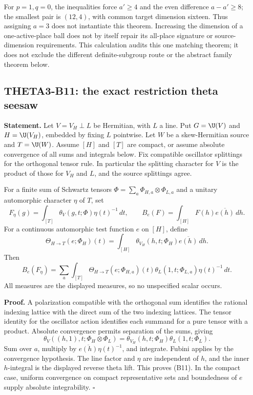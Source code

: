 For $p=1,q=0$, the inequalities force $a'\geq4$ and the even difference $a-a'\geq8$; the smallest pair is $(12,4)$, with common target dimension sixteen. Thus assigning $a=3$ does not instantiate this theorem. Increasing the dimension of a one-active-place ball does not by itself repair its all-place signature or source-dimension requirements. This calculation audits this one matching theorem; it does not exclude the different definite-subgroup route or the abstract family theorem below.

\subsection{THETA3-B11: the exact restriction theta seesaw}\label{B11}

\textbf{Statement.} Let $V=V_H\perp L$ be Hermitian, with $L$ a line. Put $G=\U(V)$ and $H=\U(V_H)$, embedded by fixing $L$ pointwise. Let $W$ be a skew-Hermitian source and $T=\U(W)$. Assume $[H]$ and $[T]$ are compact, or assume absolute convergence of all sums and integrals below. Fix compatible oscillator splittings for the orthogonal tensor rule. In particular the splitting character for $V$ is the product of those for $V_H$ and $L$, and the source splittings agree.

For a finite sum of Schwartz tensors
$\Phi=\sum_a\Phi_{H,a}\otimes\Phi_{L,a}$ and a unitary automorphic character $\eta$ of $T$, set
\[
 F_\eta(g)=\int_{[T]}\theta_V(g,t;\Phi)\eta(t)^{-1}\,dt,
 \qquad
 B_e(F)=\int_{[H]}F(h)\overline{e(h)}\,dh.
\]
For a continuous automorphic test function $e$ on $[H]$, define
\[
 \Theta_{H\to T}(e;\Phi_H)(t)=
 \int_{[H]}\theta_{V_H}(h,t;\Phi_H)\overline{e(h)}\,dh.
\]
Then
\[
 B_e(F_\eta)=\sum_a\int_{[T]}
 \Theta_{H\to T}(e;\Phi_{H,a})(t)
 \theta_L(1,t;\Phi_{L,a})\eta(t)^{-1}\,dt.
 \tag{B11}
\]
All measures are the displayed measures, so no unspecified scalar occurs.

\textbf{Proof.} A polarization compatible with the orthogonal sum identifies the rational indexing lattice with the direct sum of the two indexing lattices. The tensor identity for the oscillator action identifies each summand for a pure tensor with a product. Absolute convergence permits separation of the sums, giving
\[
 \theta_V((h,1),t;\Phi_H\otimes\Phi_L)
       =\theta_{V_H}(h,t;\Phi_H)\theta_L(1,t;\Phi_L).
\]
Sum over $a$, multiply by $\overline{e(h)}\eta(t)^{-1}$, and integrate. Fubini applies by the convergence hypothesis. The line factor and $\eta$ are independent of $h$, and the inner $h$-integral is the displayed reverse theta lift. This proves (B11). In the compact case, uniform convergence on compact representative sets and boundedness of $e$ supply absolute integrability. \hfill$\square$

